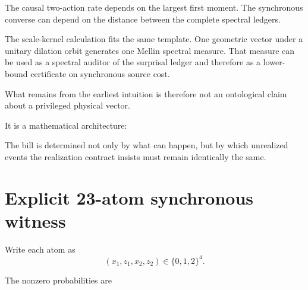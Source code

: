 \documentclass[11pt,a4paper]{article}
\newcommand{\1}{\mathbf 1}
\begin{document}
The causal two-action rate depends on the largest first moment.
The synchronous converse can depend on the distance between the complete
spectral ledgers.

The scale-kernel calculation fits the same template.
One geometric vector under a unitary dilation orbit generates one
Mellin spectral measure.
That measure can be used as a spectral auditor of the surprisal ledger
and therefore as a lower-bound certificate on synchronous source cost.

What remains from the earliest intuition is therefore not an ontological
claim about a privileged physical vector.

It is a mathematical architecture:

\begin{center}
\end{center}

The bill is determined not only by what can happen, but by which
unrealized events the realization contract insists must remain
identically the same.


\appendix

\section{Explicit 23-atom synchronous witness}
\label{app:witness}

Write each atom as
\[
(x_1,z_1,x_2,z_2)\in\{0,1,2\}^4.
\]

The nonzero probabilities are
\end{document}
